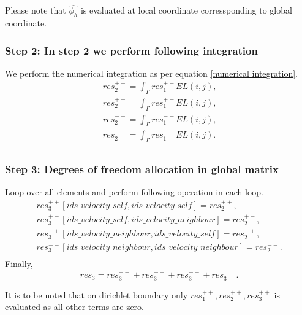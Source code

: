 \documentclass[a4paper,twoside,openright]{book}
\begin{document}
Please note that $\hat{\phi_h}$ is evaluated at local coordinate corressponding to global coordinate.

\subsubsection{Step 2: In step 2 we perform following integration}
 
We perform the numerical integration as per equation \eqref{numerical integration}.
\begin{equation}
\begin{split}
res_2^{++} = \int_{\Gamma} res_1^{++} EL(i,j) \textrm{,}\\
res_2^{+-} = \int_{\Gamma} res_1^{+-} EL(i,j) \textrm{,}\\
res_2^{-+} = \int_{\Gamma} res_1^{-+} EL(i,j) \textrm{,}\\
res_2^{--} = \int_{\Gamma} res_1^{--} EL(i,j) \textrm{.}\\
\end{split}
\end{equation}

\subsubsection{Step 3: Degrees of freedom allocation in global matrix}

Loop over all elements and perform following operation in each loop.
\begin{equation}
\begin{split}
res_3^{++}[ids\_velocity\_self,ids\_velocity\_self] = res_2^{++} \textrm{,}\\
res_3^{+-}[ids\_velocity\_self,ids\_velocity\_neighbour] = res_2^{+-} \textrm{,}\\
res_3^{-+}[ids\_velocity\_neighbour,ids\_velocity\_self] = res_2^{-+} \textrm{,}\\
res_3^{--}[ids\_velocity\_neighbour,ids\_velocity\_neighbour] = res_2^{--} \textrm{.}\\
\end{split}
\end{equation}
Finally,
\begin{equation}
res_3 = res_3^{++} + res_3^{+-} + res_3^{-+} + res_3^{--} \textrm{.}
\end{equation}

It is to be noted that on dirichlet boundary only $res_1^{++}, res_2^{++}, res_3^{++}$ is evaluated as all other terms are zero.
\end{document}

